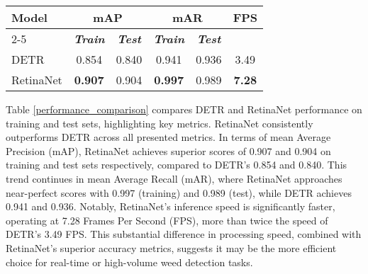 \begin{table*}[t]
\vspace{-0.4cm}
\caption{Performance Comparison of DETR and RetinaNet on Training and Test Sets}
\label{performance_comparison}
\begin{center}
\begin{tabular}{|l|c|c|c|c|c|}
\hline
\multirow{2}{*}{\textbf{Model}} & \multicolumn{2}{c|}{\textbf{mAP}} & \multicolumn{2}{c|}{\textbf{mAR}} & \multirow{2}{*}{\textbf{FPS}} \\
\cline{2-5}
& \textbf{\textit{Train}} & \textbf{\textit{Test}} & \textbf{\textit{Train}} & \textbf{\textit{Test}} & \\
\hline
DETR & 0.854 & 0.840 & 0.941 & 0.936 & 3.49 \\
RetinaNet & \textbf{0.907} & 0.904 & \textbf{0.997} & 0.989 & \textbf{7.28} \\
\hline
\end{tabular}
\end{center}
\end{table*}


Table \ref{performance_comparison} compares DETR and RetinaNet performance on training and test sets, highlighting key metrics. RetinaNet consistently outperforms DETR across all presented metrics. In terms of mean Average Precision (mAP), RetinaNet achieves superior scores of 0.907 and 0.904 on training and test sets respectively, compared to DETR's 0.854 and 0.840. This trend continues in mean Average Recall (mAR), where RetinaNet approaches near-perfect scores with 0.997 (training) and 0.989 (test), while DETR achieves 0.941 and 0.936. Notably, RetinaNet's inference speed is significantly faster, operating at 7.28 Frames Per Second (FPS), more than twice the speed of DETR's 3.49 FPS. This substantial difference in processing speed, combined with RetinaNet's superior accuracy metrics, suggests it may be the more efficient choice for real-time or high-volume weed detection tasks.


